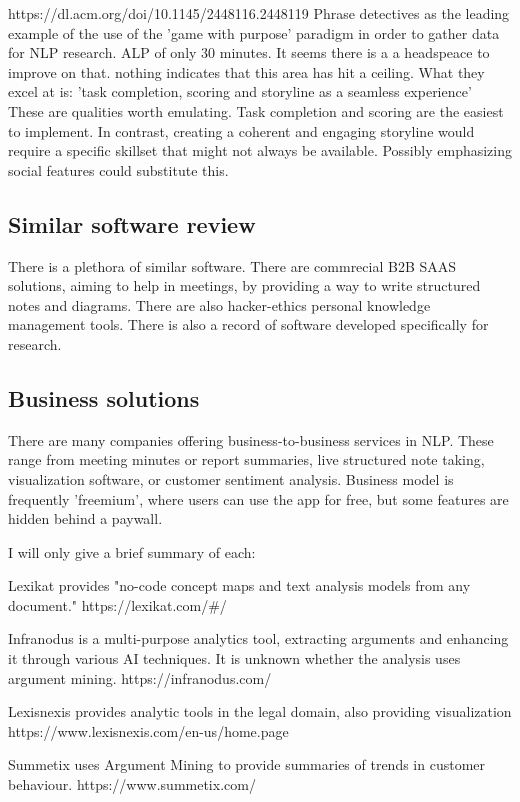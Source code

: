 \documentclass{article}
\begin{document}
https://dl.acm.org/doi/10.1145/2448116.2448119
Phrase detectives as the leading example of the use of the 'game with purpose' paradigm in order to gather data for NLP research.
ALP of only 30 minutes. It seems there is a a headspeace to improve on that. nothing indicates that this area has hit a ceiling.
What they excel at is: 'task completion, scoring and storyline as a seamless experience'
These are qualities worth emulating. Task completion and scoring are the easiest to implement. 
In contrast, creating a coherent and engaging storyline would require a specific skillset that might not always be available.
Possibly emphasizing social features could substitute this.

\subsection{Similar software review}
There is a plethora of similar software. 
There are commrecial B2B SAAS solutions, aiming to help in meetings, by providing a way to write structured notes and diagrams.
There are also hacker-ethics personal knowledge management tools.
There is also a record of software developed specifically for research.

\subsection{Business solutions}
There are many companies offering business-to-business services in NLP. 
These range from meeting minutes or report summaries, live structured note taking, visualization software, or customer sentiment analysis.
Business model is frequently 'freemium', where users can use the app for free, but some features are hidden behind a paywall.

I will only give a brief summary of each:

Lexikat provides "no-code concept maps and text analysis models from any document."
https://lexikat.com/#/

Infranodus is a multi-purpose analytics tool, extracting arguments and enhancing it through various AI techniques. 
It is unknown whether the analysis uses argument mining.
https://infranodus.com/

Lexisnexis provides analytic tools in the legal domain, also providing visualization
https://www.lexisnexis.com/en-us/home.page

Summetix uses Argument Mining to provide summaries of trends in customer behaviour.
https://www.summetix.com/
\end{document}
